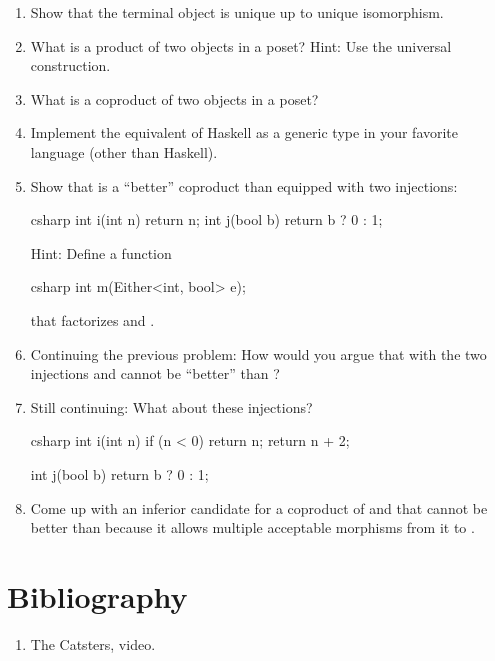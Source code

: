 \begin{enumerate}
  \tightlist
  \item
        Show that the terminal object is unique up to unique isomorphism.
  \item
        What is a product of two objects in a poset? Hint: Use the universal
        construction.
  \item
        What is a coproduct of two objects in a poset?
  \item
        Implement the equivalent of Haskell  as a generic type
        in your favorite language (other than Haskell).
  \item
        Show that  is a ``better'' coproduct than 
        equipped with two injections:

        \begin{snip}{csharp}
int i(int n) { return n; }
int j(bool b) { return b ? 0 : 1; }
\end{snip}

        Hint: Define a function

        \begin{snip}{csharp}
int m(Either<int, bool> e);
\end{snip}

        that factorizes  and .
  \item
        Continuing the previous problem: How would you argue that 
        with the two injections  and  cannot be ``better''
        than ?
  \item
        Still continuing: What about these injections?

        \begin{snip}{csharp}
int i(int n) {
    if (n < 0) return n;
    return n + 2;
}

int j(bool b) { return b ? 0 : 1; }
\end{snip}
  \item
        Come up with an inferior candidate for a coproduct of  and
         that cannot be better than  because it
        allows multiple acceptable morphisms from it to .
\end{enumerate}

\section{Bibliography}

\begin{enumerate}
  \tightlist
  \item
        The Catsters,
         video.
\end{enumerate}
